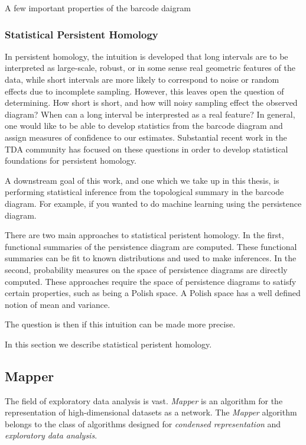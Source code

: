 A few important properties of the barcode daigram

\subsubsection{Statistical Persistent Homology}

In persistent homology, the intuition is developed that long intervals are to be interpreted as large-scale, robust, or in some sense real geometric features of the data, while short intervals are more likely to correspond to noise or random effects due to incomplete sampling.
However, this leaves open the question of determining.
How short is short, and how will noisy sampling effect the observed diagram?
When can a long interval be interprested as a real feature?
In general, one would like to be able to develop statistics from the barcode diagram and assign measures of confidence to our estimates.
Substantial recent work in the TDA community has focused on these questions in order to develop statistical foundations for persistent homology.

A downstream goal of this work, and one which we take up in this thesis, is performing statistical inference from the topological summary in the barcode diagram.
For example, if you wanted to do machine learning using the persistence diagram.

There are two main approaches to statistical peristent homology.
In the first, functional summaries of the persistence diagram are computed.
These functional summaries can be fit to known distributions and used to make inferences.
In the second, probability measures on the space of persistence diagrams are directly computed.
These approaches require the space of persistence diagrams to satisfy certain properties, such as being a Polish space.
A Polish space has a well defined notion of mean and variance.


The question is then if this intuition can be made more precise.



In this section we describe statistical peristent homology.

\subsection{Mapper}

The field of exploratory data analysis is vast.
\emph{Mapper} is an algorithm for the representation of high-dimensional datasets as a network.
The \emph{Mapper} algorithm belongs to the class of algorithms designed for \emph{condensed representation} and \emph{exploratory data analysis}.

